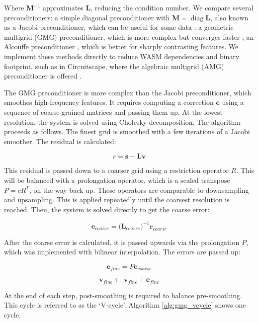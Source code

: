 \documentclass[11pt, a4paper]{article}
\DeclareMathOperator{\diag}{diag}
\begin{document}
Where $\mathbf{M}^{-1}$ approximates $\mathbf{L}$, reducing the condition number. 
We compare several preconditioners: a simple diagonal preconditioner with $\mathbf{M} = \diag{\mathbf{L}}$, also known as a Jacobi preconditioner, 
which can be useful for some data \cite{wathen2015preconditioning}; a geometric multigrid (GMG) preconditioner, which is more complex but converges faster \cite{tatebe1993multigrid};
an Alcouffe preconditioner \cite{alcouffe1981multi}, which is better for sharply contrasting features.
We implement these methods directly to reduce WASM dependencies and binary footprint. 
such as in Circuitscape, where the algebraic multigrid (AMG) preconditioner is offered \cite{hall2021circuitscape}.

The GMG preconditioner is more complex than the Jacobi preconditioner, which smoothes high-frequency features. It requires computing a correction $\mathbf{e}$ using a sequence of coarse-grained matrices and passing them up. At the lowest resolution, the system is solved using Cholesky decomposition. The algorithm proceeds as follows.
The finest grid is smoothed with a few iterations of a Jacobi smoother. The residual is calculated:

\[
r = \mathbf{s} - \mathbf{L}\mathbf{v}
\]

This residual is passed down to a coarser grid using a restriction operator $R$. 
This will be balanced with a prolongation operator, which is a scaled transpose $P = cR^T$, on the way back up.
These operators are comparable to downsampling and upsampling.
This is applied repeatedly until the coarsest resolution is reached.
Then, the system is solved directly to get the coarse error:

\[
\mathbf{e}_{coarse} = \Big(\mathbf{L}_{coarse}\Big)^{-1}\mathbf{r}_{coarse}
\]

After the coarse error is calculated, it is passed upwards via the prolongation $P$,
which was implemented with bilinear interpolation. The errors are passed up:

\[
\mathbf{e}_{fine} = P\mathbf{e}_{coarse}
\]

\[
\mathbf{v}_{fine} \leftarrow \mathbf{v}_{fine} + \mathbf{e}_{fine}
\]

At the end of each step, post-smoothing is required to balance pre-smoothing. This cycle is referred to as the `V-cycle'. 
Algorithm \ref{alg:gmg_vcycle} shows one cycle.
\end{document}
